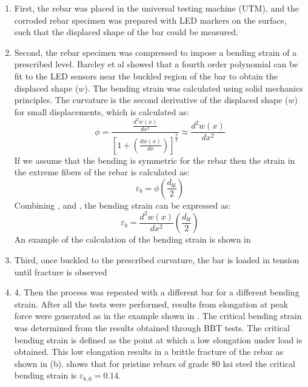 \begin{enumerate}
    \item First, the rebar was placed in the universal testing machine (UTM), and the corroded rebar specimen was prepared with LED markers on the surface, such that the displaced shape of the bar could be measured.
    \item Second, the rebar specimen was compressed to impose a bending strain of a prescribed level. Barcley et al showed that a fourth order polynomial can be fit to the LED sensors near the buckled region of the bar to obtain the displaced shape ($w$). The bending strain was calculated using solid mechanics principles. The curvature is the second derivative of the displaced shape ($w$) for small displacements, which is calculated as: 
    \begin{equation}
        \phi=\frac{\frac{d^2w(x)}{dx^2}}{\left[1+\left(\frac{dw(x)}{dx}\right)\right]^\frac{3}{2}}\approx \frac{d^2w(x)}{dx^2}
        \label{eq.CuvatureAprox}
    \end{equation}
    If we assume that the bending is symmetric for the rebar then the strain in the extreme fibers of the rebar is calculated as:
    \begin{equation}
        \varepsilon_{b}=\phi\left(\frac{d_{bl}}{2}\right) 
        \label{eq.BendingStrain}
    \end{equation}    
    Combining , and , the bending strain can be expressed as:
    \begin{equation}
        \varepsilon_{b}=\frac{d^2w(x)}{dx^2}\left(\frac{d_{bl}}{2}\right) 
        \label{eq.BendingStrainExpanded}
    \end{equation}
    An example of the calculation of the bending strain is shown in 
    \item Third, once buckled to the prescribed curvature, the bar is loaded in tension until fracture is observed
    \item 4.	Then the process was repeated with a different bar for a different bending strain. After all the tests were performed, results from elongation at peak force were generated as in the example shown in  . The critical bending strain was determined from the results obtained through BBT tests. The critical bending strain is defined as the point at which a low elongation under load is obtained. This low elongation results in a brittle fracture of the rebar as shown in (b).  shows that for pristine rebars of grade 80 ksi steel the critical bending strain is $\varepsilon_{b,0}=0.14$.
\end{enumerate}

